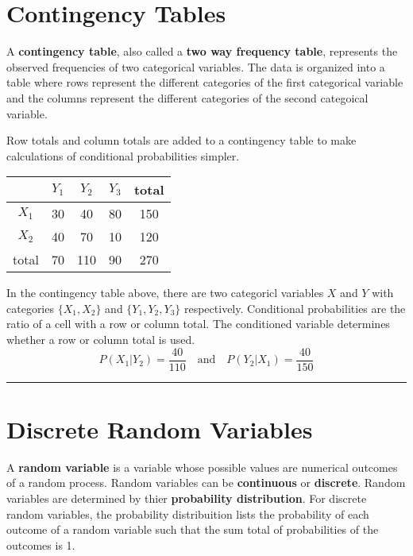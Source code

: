 \documentclass{article}
\theoremstyle{definition}
\newcommand{\secend}[0]{\noindent\rule[0.5ex]{\linewidth}{1pt}}
\newcommand{\set}[1]{\{#1\}}
\newcommand{\mand}[0]{\quad\text{and}\quad}
\begin{document}
\section*{Contingency Tables}
\begin{definition}
    A \textbf{contingency table}, also called a \textbf{two way frequency
    table}, represents the observed frequencies of two categorical variables.
    The data is organized into a table where rows represent the different
    categories of the first categorical variable and the columns represent the
    different categories of the second categoical variable.
\end{definition} 

\noindent Row totals and column totals are added to a contingency table to make
calculations of conditional probabilities simpler.     

\begin{center}
    \begin{tabular}{|c|c|c|c|c|}
        \hline
        &  $Y_1$ &  $Y_2$ &  $Y_3$ & total \\\hline
        $X_1$ & 30 & 40 & 80 & 150 \\\hline
        $X_2$ & 40 & 70 & 10 & 120 \\\hline
        total & 70 & 110 & 90 & 270 \\\hline
    \end{tabular}
\end{center}

\noindent In the contingency table above, there are two categoricl variables $X$ 
and $Y$ with categories $\set{X_1,X_2}$ and $\set{Y_1,Y_2,Y_3}$ respectively.
Conditional probabilities are the ratio of a cell with a row or column total.
The conditioned variable determines whether a row or column total is used.
\[
    P(X_1|Y_2) = \frac{40}{110} \mand P(Y_2|X_1) =
    \frac{40}{150}
\]
\secend

\section*{Discrete Random Variables}
\begin{definition}
    A \textbf{random variable} is a variable whose possible values are numerical
    outcomes of a random process. Random variables can be \textbf{continuous} or
    \textbf{discrete}.
    \tcblower
    Random variables are determined by thier \textbf{probability
    distribution}. For discrete random variables, the probability distribuition
    lists the probability of each outcome of a random variable such that the sum
    total of probabilities of the outcomes is 1.
\end{definition}
\end{document}
